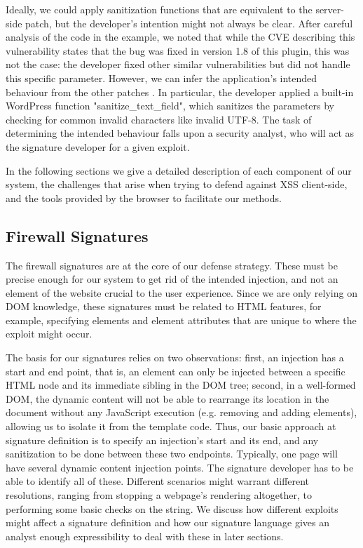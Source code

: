 Ideally, we could apply sanitization functions that are equivalent to the server-side patch, but the developer's intention might not always be clear. After careful analysis of the code in the example, we noted that while the CVE describing this vulnerability states that the bug was fixed in version 1.8 of this plugin, this was not the case: the developer fixed other similar vulnerabilities but did not handle this specific parameter. However, we can infer the application's intended behaviour from the other patches \cite{rccpatch}. In particular, the developer applied a built-in WordPress function "sanitize\_text\_field", which sanitizes the parameters by checking for common invalid characters like invalid UTF-8. The task of determining the intended behaviour falls upon a security analyst, who will act as the signature developer for a given exploit.  

In the following sections we give a detailed description of each component of our system, the challenges that arise when trying to defend against XSS client-side, and the tools provided by the browser to facilitate our methods. 
 
 \subsection{Firewall Signatures}
	 The firewall signatures are at the core of our defense strategy. These must be precise enough for our system to get rid of the intended injection, and not an element of the website crucial to the user experience. Since we are only relying on DOM knowledge, these signatures must be related to HTML features, for example, specifying elements and element attributes that are unique to where the exploit might occur. 
	 
	 The basis for our signatures relies on two observations: first, an injection has a start and end point, that is, an element can only be injected between a specific HTML node and its immediate sibling in the DOM tree; second, in a well-formed DOM, the dynamic content will not be able to rearrange its location in the document without any JavaScript execution (e.g. removing and adding elements), allowing us to isolate it from the template code. Thus, our basic approach at signature definition is to specify an injection's start and its end, and any sanitization to be done between these two endpoints. Typically, one page will have several dynamic content injection points. The signature developer has to be able to identify all of these. Different scenarios might warrant different resolutions, ranging from stopping a webpage's rendering altogether, to performing some basic checks on the string. We discuss how different exploits might affect a signature definition and how our signature language gives an analyst enough expressibility to deal with these in later sections.
	 

